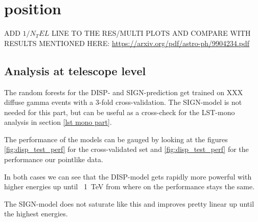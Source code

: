 \section{position}\label{position}

ADD $1/N_TEL$ LINE TO THE RES/MULTI PLOTS AND COMPARE WITH RESULTS
MENTIONED HERE:
\url{https://arxiv.org/pdf/astro-ph/9904234.pdf}

\subsection{Analysis at telescope level}

The random forests for the DISP- and SIGN-prediction get trained on
XXX diffuse gamma events with a 3-fold cross-validation.
The SIGN-model is not needed for this part, but can be useful as 
a cross-check for the LST-mono analysis in section \ref{lst mono part}.

The performance of the models can be gauged by looking at the 
figures \ref{fig:disp_test_perf} for the cross-validated set and 
\ref{fig:disp_test_perf} for the performance our 
pointlike data.

In both cases we can see that the DISP-model gets rapidly more
powerful with higher energies up until ~\SI{1}{\tera\electronvolt} from 
where on the performance stays the same.

The SIGN-model does not saturate like this and improves pretty linear up until
the highest energies.

